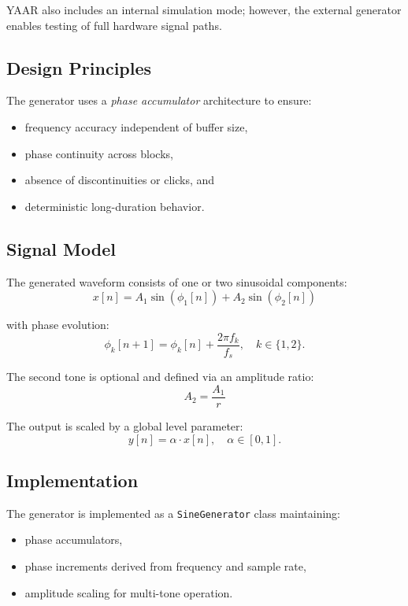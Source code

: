 \documentclass[conference]{IEEEtran}
\begin{document}
YAAR also includes an internal simulation mode; however, the external generator enables testing of full hardware signal paths.

\subsection{Design Principles}
The generator uses a \textit{phase accumulator} architecture to ensure:
\begin{itemize}[leftmargin=*,nosep]
    \item frequency accuracy independent of buffer size,
    \item phase continuity across blocks,
    \item absence of discontinuities or clicks, and
    \item deterministic long-duration behavior.
\end{itemize}

\subsection{Signal Model}
The generated waveform consists of one or two sinusoidal components:
\begin{equation}
x[n] = A_1 \sin(\phi_1[n]) + A_2 \sin(\phi_2[n])
\end{equation}

with phase evolution:
\begin{equation}
\phi_k[n+1] = \phi_k[n] + \frac{2\pi f_k}{f_s}, \quad k \in \{1,2\}.
\end{equation}

The second tone is optional and defined via an amplitude ratio:
\begin{equation}
A_2 = \frac{A_1}{r}
\end{equation}

The output is scaled by a global level parameter:
\begin{equation}
y[n] = \alpha \cdot x[n], \quad \alpha \in [0,1].
\end{equation}

\subsection{Implementation}
The generator is implemented as a \texttt{SineGenerator} class maintaining:
\begin{itemize}[leftmargin=*,nosep]
    \item phase accumulators,
    \item phase increments derived from frequency and sample rate,
    \item amplitude scaling for multi-tone operation.
\end{itemize}
\end{document}
